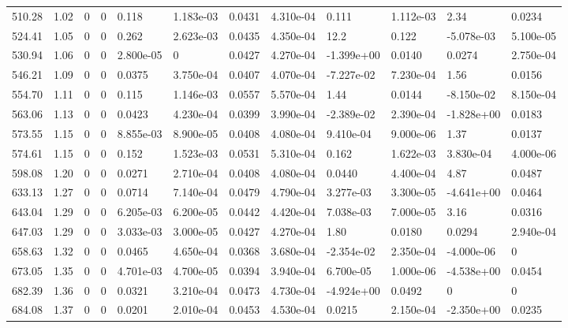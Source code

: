 \documentclass[preview]{standalone}
\begin{document}
{{{\begin{tabular}{L{1.2cm}C{1.2cm} C{0.3cm}C{0.5cm} C{1.4cm}C{1.4cm} C{1.4cm}C{1.4cm} C{1.6cm}C{1.6cm} C{1.6cm}C{1.6cm}}
  510.28  &  1.02  & 0     &  0 &  0.118  & 1.183e-03  &  0.0431&   4.310e-04& 0.111 & 1.112e-03   &  2.34 & 0.0234  \\ 
  524.41  &  1.05  & 0     &  0 &  0.262  & 2.623e-03  &  0.0435&   4.350e-04& 12.2 & 0.122   &  -5.078e-03 & 5.100e-05  \\ 
  530.94  &  1.06  & 0     &  0 &  2.800e-05  & 0  &  0.0427&   4.270e-04& -1.399e+00 & 0.0140   &  0.0274 & 2.750e-04  \\ 
  546.21  &  1.09  & 0     &  0 &  0.0375  & 3.750e-04  &  0.0407&   4.070e-04& -7.227e-02 & 7.230e-04   &  1.56 & 0.0156  \\ 
  554.70  &  1.11  & 0     &  0 &  0.115  & 1.146e-03  &  0.0557&   5.570e-04& 1.44 & 0.0144   &  -8.150e-02 & 8.150e-04  \\ 
  563.06  &  1.13  & 0     &  0 &  0.0423  & 4.230e-04  &  0.0399&   3.990e-04& -2.389e-02 & 2.390e-04   &  -1.828e+00 & 0.0183  \\ 
  573.55  &  1.15  & 0     &  0 &  8.855e-03  & 8.900e-05  &  0.0408&   4.080e-04& 9.410e-04 & 9.000e-06   &  1.37 & 0.0137  \\ 
  574.61  &  1.15  & 0     &  0 &  0.152  & 1.523e-03  &  0.0531&   5.310e-04& 0.162 & 1.622e-03   &  3.830e-04 & 4.000e-06  \\ 
  598.08  &  1.20  & 0     &  0 &  0.0271  & 2.710e-04  &  0.0408&   4.080e-04& 0.0440 & 4.400e-04   &  4.87 & 0.0487  \\ 
  633.13  &  1.27  & 0     &  0 &  0.0714  & 7.140e-04  &  0.0479&   4.790e-04& 3.277e-03 & 3.300e-05   &  -4.641e+00 & 0.0464  \\ 
  643.04  &  1.29  & 0     &  0 &  6.205e-03  & 6.200e-05  &  0.0442&   4.420e-04& 7.038e-03 & 7.000e-05   &  3.16 & 0.0316  \\ 
  647.03  &  1.29  & 0     &  0 &  3.033e-03  & 3.000e-05  &  0.0427&   4.270e-04& 1.80 & 0.0180   &  0.0294 & 2.940e-04  \\ 
  658.63  &  1.32  & 0     &  0 &  0.0465  & 4.650e-04  &  0.0368&   3.680e-04& -2.354e-02 & 2.350e-04   &  -4.000e-06 & 0  \\ 
  673.05  &  1.35  & 0     &  0 &  4.701e-03  & 4.700e-05  &  0.0394&   3.940e-04& 6.700e-05 & 1.000e-06   &  -4.538e+00 & 0.0454  \\ 
  682.39  &  1.36  & 0     &  0 &  0.0321  & 3.210e-04  &  0.0473&   4.730e-04& -4.924e+00 & 0.0492   &  0 & 0  \\ 
  684.08  &  1.37  & 0     &  0 &  0.0201  & 2.010e-04  &  0.0453&   4.530e-04& 0.0215 & 2.150e-04   &  -2.350e+00 & 0.0235  \\ 

\end{tabular}}}}
\end{document}
